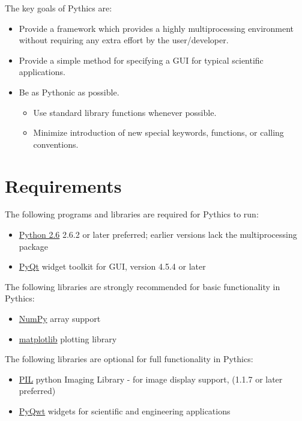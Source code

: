 \documentclass[letterpaper,10pt,english]{sphinxmanual}
\begin{document}
The key goals of Pythics are:
\begin{itemize}
\item {} 
Provide a framework which provides a highly multiprocessing environment
without requiring any extra effort by the user/developer.

\item {} 
Provide a simple method for specifying a GUI for typical scientific
applications.

\item {} 
Be as Pythonic as possible.
\begin{itemize}
\item {} 
Use standard library functions whenever possible.

\item {} 
Minimize introduction of new special keywords, functions, or calling
conventions.

\end{itemize}

\end{itemize}


\section{Requirements}
\label{getting_started:requirements}
The following programs and libraries are required for Pythics to run:
\begin{itemize}
\item {} 
\href{http://www.python.org/download/releases/2.6/}{Python 2.6} 2.6.2 or later preferred; earlier versions lack the
multiprocessing package

\item {} 
\href{http://www.riverbankcomputing.co.uk/software/pyqt/intro}{PyQt} widget toolkit for GUI, version 4.5.4 or later

\end{itemize}

The following libraries are strongly recommended for basic functionality in
Pythics:
\begin{itemize}
\item {} 
\href{http://numpy.scipy.org/}{NumPy} array support

\item {} 
\href{http://matplotlib.sourceforge.net/}{matplotlib} plotting library

\end{itemize}

The following libraries are optional for full functionality in Pythics:
\begin{itemize}
\item {} 
\href{http://www.pythonware.com/products/pil/}{PIL} python Imaging Library - for image display support, (1.1.7 or later
preferred)

\item {} 
\href{http://pyqwt.sourceforge.net/}{PyQwt} widgets for scientific and engineering applications

\end{itemize}
\end{document}
